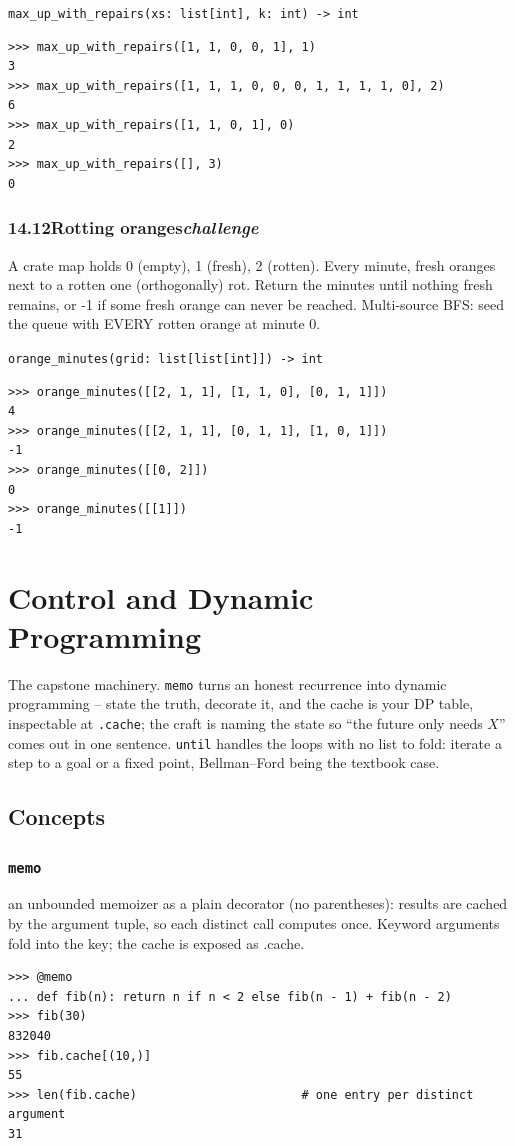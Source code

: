 \documentclass[10pt,letterpaper]{book}
\begin{document}
\noindent\texttt{max\_up\_with\_repairs(xs: list[int], k: int) -> int}
\begin{lstlisting}[style=ex]
>>> max_up_with_repairs([1, 1, 0, 0, 1], 1)
3
>>> max_up_with_repairs([1, 1, 1, 0, 0, 0, 1, 1, 1, 1, 0], 2)
6
>>> max_up_with_repairs([1, 1, 0, 1], 0)
2
>>> max_up_with_repairs([], 3)
0
\end{lstlisting}
\subsection*{14.12\quad Rotting oranges\hfill\textnormal{\textit{challenge}}}
A crate map holds 0 (empty), 1 (fresh), 2 (rotten). Every minute, fresh oranges next to a rotten one (orthogonally) rot. Return the minutes until nothing fresh remains, or -1 if some fresh orange can never be reached. Multi-source BFS: seed the queue with EVERY rotten orange at minute 0.

\noindent\texttt{orange\_minutes(grid: list[list[int]]) -> int}
\begin{lstlisting}[style=ex]
>>> orange_minutes([[2, 1, 1], [1, 1, 0], [0, 1, 1]])
4
>>> orange_minutes([[2, 1, 1], [0, 1, 1], [1, 0, 1]])
-1
>>> orange_minutes([[0, 2]])
0
>>> orange_minutes([[1]])
-1
\end{lstlisting}
\clearpage
\chapter{Control and Dynamic Programming}

The capstone machinery. \texttt{memo} turns an honest recurrence into
dynamic programming -- state the truth, decorate it, and the cache is your
DP table, inspectable at \texttt{.cache}; the craft is naming the state so
``the future only needs $X$'' comes out in one sentence. \texttt{until}
handles the loops with no list to fold: iterate a step to a goal or a fixed
point, Bellman--Ford being the textbook case.
\section{Concepts}
\subsection{\texttt{memo}}\label{def:memo}
an unbounded memoizer as a plain decorator (no parentheses): results are cached by the argument tuple, so each distinct call computes once. Keyword arguments fold into the key; the cache is exposed as .cache.
\begin{lstlisting}[style=ex]
>>> @memo
... def fib(n): return n if n < 2 else fib(n - 1) + fib(n - 2)
>>> fib(30)
832040
>>> fib.cache[(10,)]
55
>>> len(fib.cache)                       # one entry per distinct argument
31
\end{lstlisting}
\end{document}

